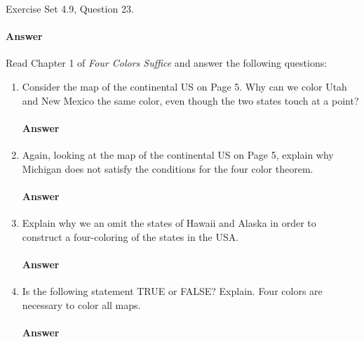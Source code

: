 \documentclass{article}
\begin{document}
Exercise Set 4.9, Question 23.

\paragraph{Answer}


\collab{\todo{}}
Read Chapter 1 of \emph{Four Colors Suffice} and answer the following questions:

\begin{enumerate}

    \item Consider the map of the continental US on Page 5.  Why can we color
        Utah and New Mexico the same color, even though the two states touch at
        a point?

        \paragraph{Answer}

    \item Again, looking at the map of the continental US on Page 5, explain why
        Michigan does not satisfy the conditions for the four color theorem.

        \paragraph{Answer}

    \item Explain why we an omit the states of Hawaii and Alaska in order to
        construct a four-coloring of the states in the USA.

        \paragraph{Answer}

    \item Is the following statement TRUE or FALSE?  Explain. Four colors are
        necessary to color all maps.

        \paragraph{Answer}


\end{enumerate}
\end{document}
